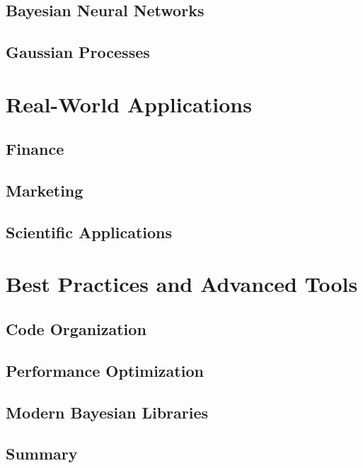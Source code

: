 \documentclass[
  letterpaper,
  paper=6in:9in,pagesize=pdftex,footinclude=on,11pt]{scrreprt}
\begin{document}
\chapter{Bayesian Neural Networks}\label{bayesian-neural-networks}

\chapter{Gaussian Processes}\label{gaussian-processes}

\part{Real-World Applications}

\chapter{Finance}\label{finance}

\chapter{Marketing}\label{marketing}

\chapter{Scientific Applications}\label{scientific-applications}

\part{Best Practices and Advanced Tools}

\chapter{Code Organization}\label{code-organization}

\chapter{Performance Optimization}\label{performance-optimization}

\chapter{Modern Bayesian Libraries}\label{modern-bayesian-libraries}


\chapter{Summary}\label{summary}
\end{document}
